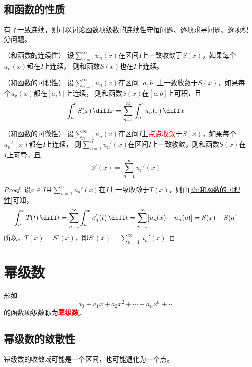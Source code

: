 \subsection{和函数的性质}
有了一致连续，则可以讨论函数项级数的连续性守恒问题、逐项求导问题、逐项积分问题。
\begin{theorem}
    （和函数的连续性）
    \label{th:和函数的连续性}
    设$\displaystyle\sum_{n=1}^\infty u_n(x)$在区间$I$上一致收敛于$S(x)$，如果每个$u_n(x)$都在$I$上连续，
    则和函数$S(x)$也在$I$上连续。
\end{theorem}
\begin{theorem}
    （和函数的可积性）
    \label{th:和函数的可积性}
    设$\displaystyle\sum_{n=1}^\infty u_n(x)$在区间$[a,b]$上一致收敛于$S(x)$，如果每个$u_n(x)$都在$[a,b]$上连续，
    则和函数$S(x)$在$[a,b]$上可积，且
    \[ \int_a^b S(x)\,\diff x = \sum_{n=1}^\infty \int_a^b u_n(x)\,\diff x \]
\end{theorem}
\begin{theorem}
    （和函数的可微性）
    \label{th:和函数的可微性}
    设$\displaystyle\sum_{n=1}^\infty u_n(x)$在区间$I$上\textcolor{red}{点点收敛}于$S(x)$，如果每个$u_n'(x)$都在$I$上连续，
    则$\displaystyle\sum_{n=1}^\infty u_n'(x)$在区间$I$上一致收敛，则和函数$S(x)$在$I$上可导，且
    \[ S'(x) = \sum_{n=1}^\infty u_n'(x) \]
\end{theorem}
\begin{proof}
    设$a\in I$且$\displaystyle\sum_{n=1}^\infty u_n'(x)$在$I$上一致收敛于$T(x)$，则由\ref{th:和函数的可积性}可知，
    \[
        \int_a^x T(t)\,\diff t
        =
        \sum_{n=1}^\infty \int_a^x u_n'(t)\,\diff t
        =
        \sum_{n=1}^\infty [u_n(x)-u_n(a)]
        =
        S(x) - S(a)
    \]
    所以，$T(x)=S'(x)$，即$\displaystyle S'(x)=\sum_{n=1}^\infty u_n'(x)$
\end{proof}

\section{幂级数}
形如
\[ a_0 + a_1x + a_2x^2 + \cdots + a_nx^n +\cdots \]
的函数项级数称为\textcolor{red}{\textbf{\textsf{幂级数}}}。

\subsection{幂级数的敛散性}
幂级数的收敛域可能是一个区间，也可能退化为一个点。

